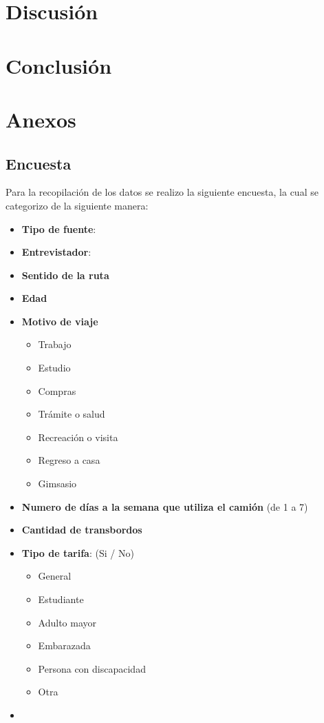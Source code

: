 \documentclass{article}
\begin{document}
\section{Discusión}

\section{Conclusión}

\newpage
\section*{Anexos}
\subsection{Encuesta}
Para la recopilación de los datos se realizo la siguiente encuesta, la cual se categorizo de la siguiente manera:
\begin{itemize}
    \item \textbf{Tipo de fuente}:
    \item  \textbf{Entrevistador}:
    \item \textbf{Sentido de la ruta}
    \item \textbf{Edad}
    \item \textbf{Motivo de viaje}
        \begin{itemize}
            \item Trabajo
            \item Estudio
            \item Compras
            \item Trámite o salud
            \item Recreación o visita
            \item Regreso a casa
            \item Gimsasio
            
        \end{itemize}
    \item \textbf{Numero de días a la semana que utiliza el camión} (de 1 a 7)
    \item \textbf{Cantidad de transbordos}
    \item \textbf{Tipo de tarifa}: (Si / No)
        \begin{itemize}
            \item General
            \item Estudiante
            \item Adulto mayor
            \item Embarazada
            \item Persona con discapacidad
            \item Otra
        \end{itemize}
    \item \textbf{}
    
\end{itemize}
\end{document}
